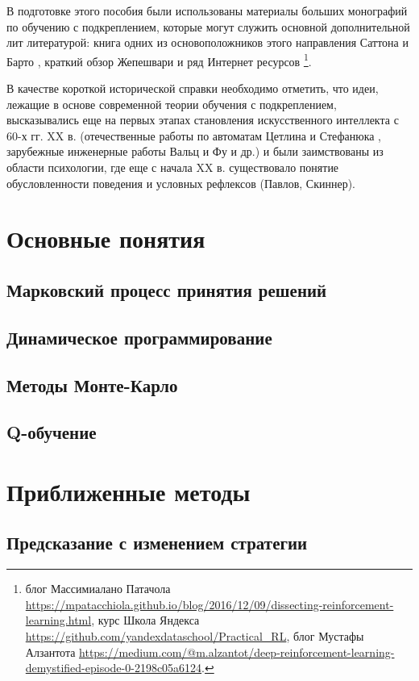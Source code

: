 \documentclass[12pt]{memoir}
\begin{document}
	В подготовке этого пособия были использованы материалы больших монографий по обучению с подкреплением, которые могут служить основной дополнительной лит литературой: книга одних из основоположников этого направления Саттона и Барто \cite{Sutton2011}, краткий обзор Жепешвари \cite{Szepesvari2010} и ряд Интернет ресурсов \footnote{блог Массимиалано Патачола \url{https://mpatacchiola.github.io/blog/2016/12/09/dissecting-reinforcement-learning.html}, курс Школа Яндекса \url{https://github.com/yandexdataschool/Practical\_RL}, блог Мустафы Алзантота \url{https://medium.com/@m.alzantot/deep-reinforcement-learning-demystified-episode-0-2198c05a6124}.}.
	
	В качестве короткой исторической справки необходимо отметить, что идеи, лежащие в основе современной теории обучения с подкреплением, высказывались еще на первых этапах становления искусственного интеллекта с 60-х гг. XX в. (отечественные работы по автоматам Цетлина и Стефанюка \cite{Stefanuk2004}, зарубежные инженерные работы Вальц и Фу и др.\cite{Waltz1965}) и были заимствованы из области психологии, где еще с начала XX в. существовало понятие обусловленности поведения и условных рефлексов (Павлов, Скиннер).
	
	\chapter{Основные понятия}
		\section{Марковский процесс принятия решений}
			
		
		\section{Динамическое программирование}
	
		\section{Методы Монте-Карло}
		
		\section{Q-обучение}
	
	\chapter{Приближенные методы}
		\section{Предсказание с изменением стратегии}
		
\end{document}
